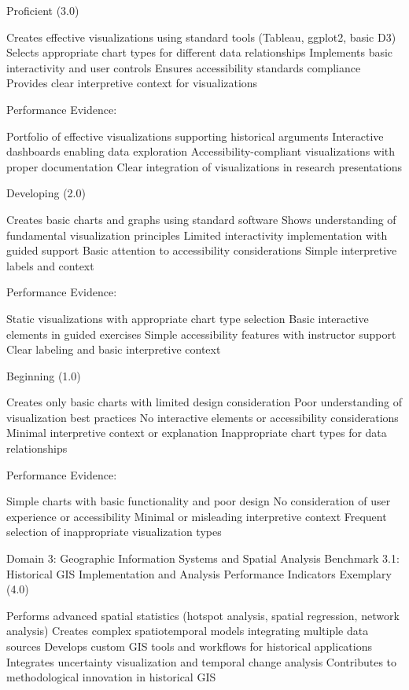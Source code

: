 \begin{appendices}
Proficient (3.0)

Creates effective visualizations using standard tools (Tableau, ggplot2, basic D3)
Selects appropriate chart types for different data relationships
Implements basic interactivity and user controls
Ensures accessibility standards compliance
Provides clear interpretive context for visualizations

Performance Evidence:

Portfolio of effective visualizations supporting historical arguments
Interactive dashboards enabling data exploration
Accessibility-compliant visualizations with proper documentation
Clear integration of visualizations in research presentations

Developing (2.0)

Creates basic charts and graphs using standard software
Shows understanding of fundamental visualization principles
Limited interactivity implementation with guided support
Basic attention to accessibility considerations
Simple interpretive labels and context

Performance Evidence:

Static visualizations with appropriate chart type selection
Basic interactive elements in guided exercises
Simple accessibility features with instructor support
Clear labeling and basic interpretive context

Beginning (1.0)

Creates only basic charts with limited design consideration
Poor understanding of visualization best practices
No interactive elements or accessibility considerations
Minimal interpretive context or explanation
Inappropriate chart types for data relationships

Performance Evidence:

Simple charts with basic functionality and poor design
No consideration of user experience or accessibility
Minimal or misleading interpretive context
Frequent selection of inappropriate visualization types


Domain 3: Geographic Information Systems and Spatial Analysis
Benchmark 3.1: Historical GIS Implementation and Analysis
Performance Indicators
Exemplary (4.0)

Performs advanced spatial statistics (hotspot analysis, spatial regression, network analysis)
Creates complex spatiotemporal models integrating multiple data sources
Develops custom GIS tools and workflows for historical applications
Integrates uncertainty visualization and temporal change analysis
Contributes to methodological innovation in historical GIS


\end{appendices}
